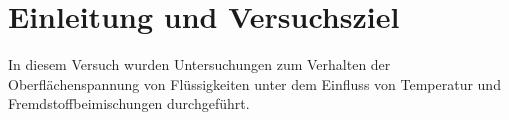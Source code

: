 \section{Einleitung und Versuchsziel}
\label{sec:aufgabenstellung}
In diesem Versuch wurden Untersuchungen zum Verhalten der Oberflächenspannung von Flüssigkeiten unter dem Einfluss von Temperatur und Fremdstoffbeimischungen durchgeführt.



